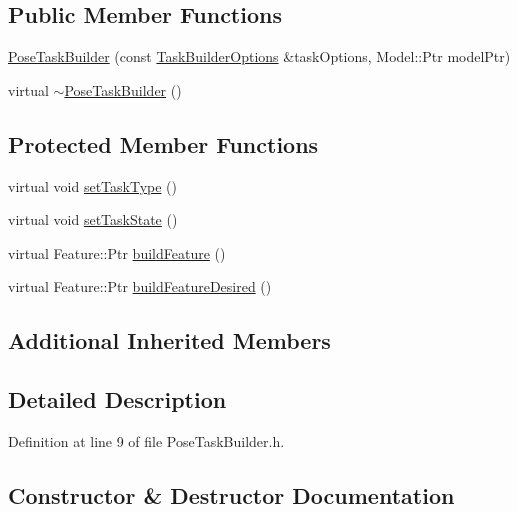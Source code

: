 \subsection*{Public Member Functions}
\begin{DoxyCompactItemize}
\item 
\hyperlink{classocra_1_1PoseTaskBuilder_aee81134b7353f3ee147a6129a0a265a9}{Pose\+Task\+Builder} (const \hyperlink{classocra_1_1TaskBuilderOptions}{Task\+Builder\+Options} \&task\+Options, Model\+::\+Ptr model\+Ptr)
\item 
virtual \hyperlink{classocra_1_1PoseTaskBuilder_ad71d138985d6a4c6145818b5ab51b72a}{$\sim$\+Pose\+Task\+Builder} ()
\end{DoxyCompactItemize}
\subsection*{Protected Member Functions}
\begin{DoxyCompactItemize}
\item 
virtual void \hyperlink{classocra_1_1PoseTaskBuilder_aafc5b611352f7cbebecaa51cf534c68c}{set\+Task\+Type} ()
\item 
virtual void \hyperlink{classocra_1_1PoseTaskBuilder_a3bc6c07a3ee7656a1f3051500baddbd8}{set\+Task\+State} ()
\item 
virtual Feature\+::\+Ptr \hyperlink{classocra_1_1PoseTaskBuilder_a9a5cd51010fb610f00eea794e1f8f701}{build\+Feature} ()
\item 
virtual Feature\+::\+Ptr \hyperlink{classocra_1_1PoseTaskBuilder_a66fa4cdba48138741e19e642684a7006}{build\+Feature\+Desired} ()
\end{DoxyCompactItemize}
\subsection*{Additional Inherited Members}


\subsection{Detailed Description}


Definition at line 9 of file Pose\+Task\+Builder.\+h.



\subsection{Constructor \& Destructor Documentation}
\hypertarget{classocra_1_1PoseTaskBuilder_aee81134b7353f3ee147a6129a0a265a9}{}\label{classocra_1_1PoseTaskBuilder_aee81134b7353f3ee147a6129a0a265a9} 
